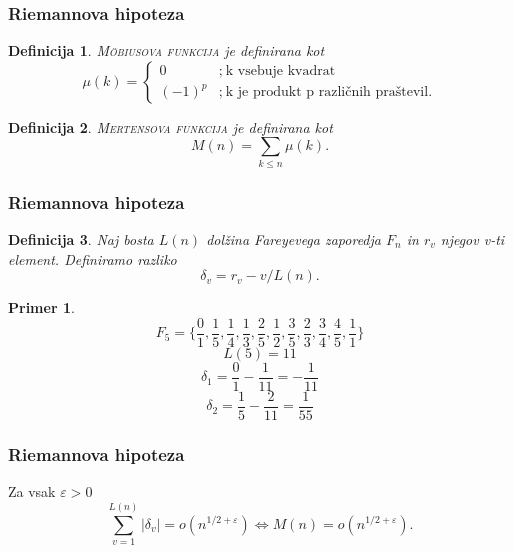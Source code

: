 \documentclass{beamer}
\newtheorem{definicija}{Definicija}
\newtheorem{primer}{Primer}
\newcommand{\pojem}[1]{\textsc{#1}}
\begin{document}

\begin{frame}
\frametitle{Riemannova hipoteza}

\begin{definicija}
\pojem{M\"obiusova funkcija} je definirana kot
\[
\mu(k) = \left\{
\begin{array}{rl}
0 & ;\ \mbox{k vsebuje kvadrat}\\
(-1)^p & ;\  \mbox{k je produkt p različnih praštevil.}
\end{array}
\right.
\]
\end{definicija}

\begin{definicija}
\pojem{Mertensova funkcija} je definirana kot
\[ M(n)=\sum_{k\leq n}\mu(k).\]
\end{definicija}

\end{frame}


\begin{frame}
\frametitle{Riemannova hipoteza}

\begin{definicija}
Naj bosta $L(n)$ dolžina Fareyevega zaporedja $F_{n}$ in $r_{v}$ njegov v-ti element. Definiramo razliko
\[ \delta_{v}= r_{v}-v/L(n). \]
\end{definicija}

\begin{primer}
\[ F_5 = \{\frac{0}{1}, \frac{1}{5}, \frac{1}{4}, \frac{1}{3}, \frac{2}{5}, \frac{1}{2}, \frac{3}{5}, \frac{2}{3}, \frac{3}{4}, \frac{4}{5}, \frac{1}{1}\} \]
\[ L(5) = 11 \]
\[ \delta_{1} = \frac{0}{1} - \frac{1}{11} = -\frac{1}{11} \]
\[ \delta_{2} = \frac{1}{5} - \frac{2}{11} = \frac{1}{55} \]
\end{primer}

\end{frame}


\begin{frame}
\frametitle{Riemannova hipoteza}

Za vsak $\varepsilon > 0$ 
\[ \sum_{v=1}^{L(n)}|\delta_{v}| = o(n^{1/2+\varepsilon}) \iff M(n) = o(n^{1/2+\varepsilon}). \]

\end{frame}

\end{document}
